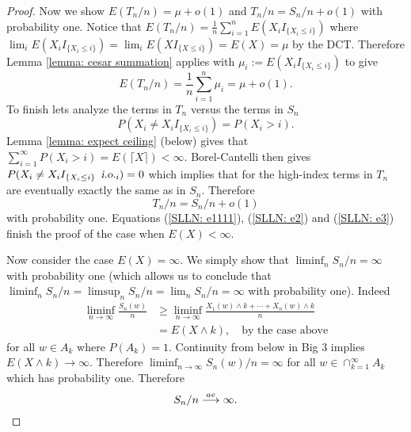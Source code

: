 \begin{proof}
Now we show $E(T_{n}/n)  = \mu + o(1)$ and  $T_{n}/n = S_{n}/n + o(1)$ with probability one. 
Notice that
$E(T_{n}/n) = \frac{1}{n} \sum_{i=1}^n E( X_iI_{\{X_i \leq i\}}) $
 where $\lim_i E( X_iI_{\{X_i \leq i\}}) = \lim_i E( X I_{\{X \leq i\}}) = E(X) = \mu$  by the DCT. Therefore Lemma \ref{lemma: cesar summation} applies with $\mu_i:= E( X_iI_{\{X_i \leq i\}})$ to give
\begin{equation}
\label{SLLN: e3}
E(T_{n}/n)  =  \frac{1}{n} \sum_{i=1}^n \mu_i =  \mu + o(1).
\end{equation}
To finish lets analyze the terms in $T_n$ versus the terms in $S_n$
\[P(X_i \neq X_iI_{\{X_i \leq i\}}) = P(X_i > i ).  \]
Lemma \ref{lemma: expect ceiling} (below) gives that $\sum_{i=1}^\infty P(X_i > i ) = E(\lceil X \rceil)<\infty$. Borel-Cantelli  then gives $P(X_i \neq X_iI_{\{X_i \leq i\}} \, {\,\,\text{\sl i.o.} }_i) = 0$  which implies that for the high-index terms in $T_n$ are eventually exactly the same as in $S_n$. Therefore
\begin{equation}
\label{SLLN: e2}
T_{n}/n = S_{n}/n + o(1)
\end{equation}
with probability one. 
Equations (\ref{SLLN: e1111}), (\ref{SLLN: e2}) and (\ref{SLLN: e3}) finish the proof of the case when $E(X)<\infty$.




Now  consider the case  $E(X) = \infty$. 
We simply show that $\liminf_n S_n/n =\infty$ with probability one (which allows us to conclude that $\liminf_n S_n/n =\limsup_n S_n/n= \lim_n S_n/n = \infty$ with probability one). Indeed
\begin{align*}
\liminf_{n\rightarrow \infty }\frac{S_n(w)}{n}
&\geq \liminf_{n\rightarrow \infty } \frac{X_1(w)\wedge k + \cdots + X_n(w)\wedge k}{n} \\
&= E(X\wedge k), \quad\text{by the case above}
\end{align*}
for all $w\in A_k$ where $P(A_k)=1$. Continuity from below in Big 3 implies $E(X\wedge k)\rightarrow \infty $. Therefore 
$\liminf_{n\rightarrow \infty }S_n(w)/n = \infty $
for all $w\in \cap_{k=1}^\infty A_k$ which has probability one. Therefore
\[S_n/n \overset{\small ae} \longrightarrow \infty. \]






 \end{proof} %





